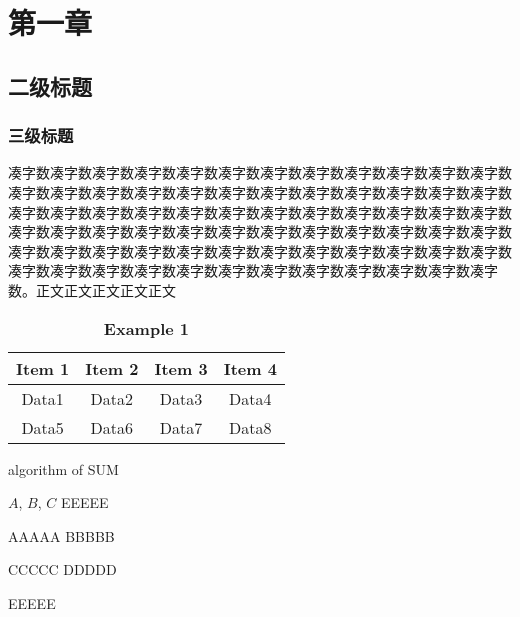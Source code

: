 \section{第一章}
\subsection{二级标题}
\subsubsection{三级标题}
凑字数凑字数凑字数凑字数凑字数凑字数凑字数凑字数凑字数凑字数凑字数凑字数凑字数凑字数凑字数凑字数凑字数凑字数凑字数凑字数凑字数凑字数凑字数凑字数凑字数凑字数凑字数凑字数凑字数凑字数凑字数凑字数凑字数凑字数凑字数凑字数凑字数凑字数凑字数凑字数凑字数凑字数凑字数凑字数凑字数凑字数凑字数凑字数凑字数凑字数凑字数凑字数凑字数凑字数凑字数凑字数凑字数凑字数凑字数凑字数凑字数凑字数凑字数凑字数凑字数凑字数凑字数凑字数凑字数凑字数凑字数凑字数\textsuperscript{\cite{ref1}}。正文正文正文正文正文\par

\begin{table}[H]
    \caption{\textbf{Example 1}}%
    \centering%
    \begin{tabular}{cccc}%
    \toprule%
    Item 1&Item 2&Item 3&Item 4 \\
    \midrule%
    Data1&Data2&Data3&Data4 \\
    Data5&Data6&Data7&Data8 \\
    \bottomrule%
    \end{tabular}
\end{table}
\begin{algorithm}[!h]
    \caption{algorithm of SUM}
    \label{alg:AOA}
    \renewcommand{\algorithmicrequire}{\textbf{Input:}}
    \renewcommand{\algorithmicensure}{\textbf{Output:}}
    \begin{algorithmic}[1]
        \REQUIRE $A$, $B$, $C$  %
        \ENSURE EEEEE    %
        
        \STATE  AAAAA
            \STATE BBBBB
        \ENDWHILE
        
                \STATE CCCCC
            \ELSE
                \STATE DDDDD
            \ENDIF
        \ENDFOR
        
        \RETURN EEEEE
    \end{algorithmic}
\end{algorithm}
